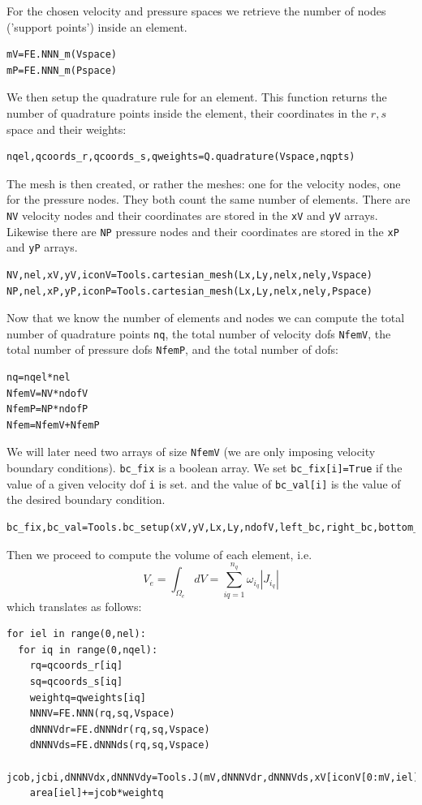 For the chosen velocity and pressure spaces we retrieve the number of nodes 
('support points') inside an element.
\begin{lstlisting}
mV=FE.NNN_m(Vspace)
mP=FE.NNN_m(Pspace)
\end{lstlisting}

We then setup the quadrature rule for an element. This function 
returns the number of quadrature points inside the element, 
their coordinates in the $r,s$ space and their weights: 
\begin{lstlisting}
nqel,qcoords_r,qcoords_s,qweights=Q.quadrature(Vspace,nqpts)
\end{lstlisting}

The mesh is then created, or rather the meshes: one for the 
velocity nodes, one for the pressure nodes. They both count the 
same number of elements. There are \lstinline{NV} velocity nodes and their
coordinates are stored in the \lstinline{xV} and \lstinline{yV} arrays.
Likewise there are \lstinline{NP} pressure nodes and their
coordinates are stored in the \lstinline{xP} and \lstinline{yP} arrays. 

\begin{lstlisting}
NV,nel,xV,yV,iconV=Tools.cartesian_mesh(Lx,Ly,nelx,nely,Vspace)
NP,nel,xP,yP,iconP=Tools.cartesian_mesh(Lx,Ly,nelx,nely,Pspace)
\end{lstlisting}

Now that we know the number of elements and nodes we can compute the 
total number of quadrature points \lstinline{nq}, 
the total number of velocity dofs \lstinline{NfemV}, 
the total number of pressure dofs \lstinline{NfemP}, 
and the total number of dofs:

\begin{lstlisting}
nq=nqel*nel
NfemV=NV*ndofV
NfemP=NP*ndofP
Nfem=NfemV+NfemP
\end{lstlisting}

We will later need two arrays of size \lstinline{NfemV} (we are only imposing
velocity boundary conditions). \lstinline{bc_fix} is a boolean array.
We set \lstinline{bc_fix[i]=True} if the value of a given velocity dof \lstinline{i} is set. 
and the value of \lstinline{bc_val[i]} is the value of the desired boundary condition.

\begin{lstlisting}
bc_fix,bc_val=Tools.bc_setup(xV,yV,Lx,Ly,ndofV,left_bc,right_bc,bottom_bc,top_bc)
\end{lstlisting}

Then we proceed to compute the volume of each element, i.e. 
\[
V_e = \int_{\Omega_e} dV = \sum_{iq=1}^{n_q} \omega_{i_q} |J_{i_q}|
\]
which translates as follows: 
\begin{lstlisting}
for iel in range(0,nel):
  for iq in range(0,nqel):
    rq=qcoords_r[iq]
    sq=qcoords_s[iq]
    weightq=qweights[iq]
    NNNV=FE.NNN(rq,sq,Vspace)
    dNNNVdr=FE.dNNNdr(rq,sq,Vspace)
    dNNNVds=FE.dNNNds(rq,sq,Vspace)
    jcob,jcbi,dNNNVdx,dNNNVdy=Tools.J(mV,dNNNVdr,dNNNVds,xV[iconV[0:mV,iel]],yV[iconV[0:mV,iel]])
    area[iel]+=jcob*weightq
\end{lstlisting}

